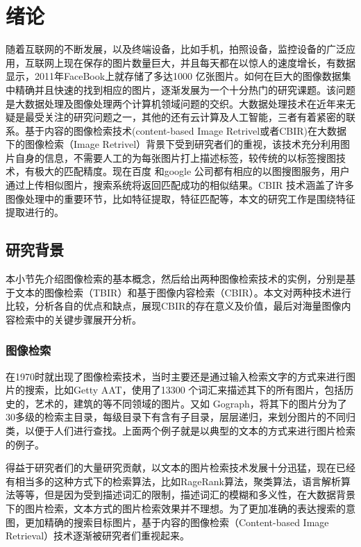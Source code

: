 ﻿\chapter{绪论}

随着互联网的不断发展，以及终端设备，比如手机，拍照设备，监控设备的广泛应用，互联网上现在保存的图片数量巨大，并且每天都在以惊人的速度增长，有数据显示，2011年FaceBook上就存储了多达1000 亿张图片。如何在巨大的图像数据集中精确并且快速的找到相应的图片，逐渐发展为一个十分热门的研究课题。该问题是大数据处理及图像处理两个计算机领域问题的交织。大数据处理技术在近年来无疑是最受关注的研究问题之一，其他的还有云计算及人工智能，三者有着紧密的联系。基于内容的图像检索技术(content-based Image Retrivel或者CBIR)在大数据下的图像检索（Image Retrivel）背景下受到研究者们的重视，该技术充分利用图片自身的信息，不需要人工的为每张图片打上描述标签，较传统的以标签搜图技术，有极大的匹配精度。现在百度 和google 公司都有相应的以图搜图服务，用户通过上传相似图片，搜索系统将返回匹配成功的相似结果。CBIR 技术涵盖了许多图像处理中的重要环节，比如特征提取，特征匹配等，本文的研究工作是围绕特征提取进行的。

\section{研究背景}
本小节先介绍图像检索的基本概念，然后给出两种图像检索技术的实例，分别是基于文本的图像检索（TBIR）和基于图像内容检索（CBIR）。本文对两种技术进行比较，分析各自的优点和缺点，展现CBIR的存在意义及价值，最后对海量图像内容检索中的关键步骤展开分析。

\subsection{图像检索}
在1970时就出现了图像检索技术，当时主要还是通过输入检索文字的方式来进行图片的搜索，比如Getty AAT，使用了13300 个词汇来描述其下的所有图片，包括历史的，艺术的，建筑的等不同领域的图片。又如 Gograph，将其下的图片分为了30多级的检索主目录，每级目录下有含有子目录，层层递归，来划分图片的不同归类，以便于人们进行查找。上面两个例子就是以典型的文本的方式来进行图片检索的例子。

得益于研究者们的大量研究贡献，以文本的图片检索技术发展十分迅猛，现在已经有相当多的这种方式下的检索算法，比如RageRank算法，聚类算法，语言解析算法等等，但是因为受到描述词汇的限制，描述词汇的模糊和多义性，在大数据背景下的图片检索，文本方式的图片检索效果并不理想。为了更加准确的表达搜索的意图，更加精确的搜索目标图片，基于内容的图像检索（Content-based Image Retrieval）技术逐渐被研究者们重视起来。

